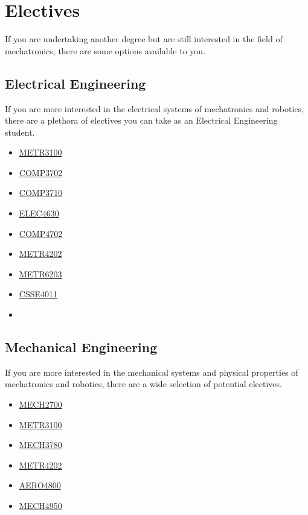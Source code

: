 \chapter{Electives}
If you are undertaking another degree but are still interested in the field of mechatronics, there are some options available to you.

\section{Electrical Engineering}
If you are more interested in the electrical systems of mechatronics and robotics, there are a plethora of electives you can take as an Electrical Engineering student.
\begin{multicols}{3}
    \begin{itemize}
        \item \hyperlink{METR3100}{METR3100}
        \item \hyperlink{COMP3702}{COMP3702}
        \item \hyperlink{COMP3710}{COMP3710}
        \item \hyperlink{ELEC4630}{ELEC4630}
        \item \hyperlink{COMP4702}{COMP4702}
        \item \hyperlink{METR4202}{METR4202}
        \item \hyperlink{METR6203}{METR6203}
        \item \hyperlink{CSSE4011}{CSSE4011}
        \item[]
    \end{itemize}
\end{multicols}

\section{Mechanical Engineering}
If you are more interested in the mechanical systems and physical properties of mechatronics and robotics, there are a wide selection of potential electives.
\begin{multicols}{3}
    \begin{itemize}
        \item \hyperlink{MECH2700}{MECH2700}
        \item \hyperlink{METR3100}{METR3100}
        \item \hyperlink{MECH3780}{MECH3780}
        \item \hyperlink{METR4202}{METR4202}
        \item \hyperlink{AERO4800}{AERO4800}
        \item \hyperlink{MECH4950}{MECH4950}
    \end{itemize}
\end{multicols}

